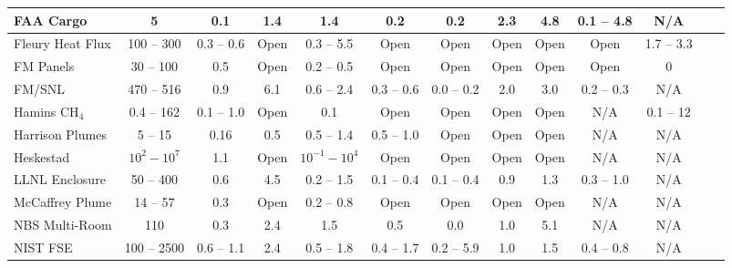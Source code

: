 \begin{table}
\begin{center}
\begin{tabular}{|l|c|c|c|c|c|c|c|c|c|c|c|c|}
FAA Cargo           & 5             & 0.1           & 1.4   & 1.4               & 0.2                 & 0.2           & 2.3         & 4.8         & 0.1 -- 4.8            & N/A                   \\ \hline
Fleury Heat Flux    & 100 -- 300    & 0.3 -- 0.6    & Open  & 0.3 -- 5.5        & Open                & Open          & Open        & Open        & Open                  & 1.7 -- 3.3            \\ \hline
FM Panels           & 30 -- 100     & 0.5           & Open  & 0.2 -- 0.5        & Open                & Open          & Open        & Open        & Open                  & 0                     \\ \hline
FM/SNL              & 470 -- 516    & 0.9           & 6.1   & 0.6 -- 2.4        & 0.3 -- 0.6          & 0.0 -- 0.2    & 2.0         & 3.0         & 0.2 -- 0.3            & N/A                   \\ \hline
Hamins CH$_4$       & 0.4 -- 162    & 0.1 -- 1.0    & Open  & 0.1               & Open                & Open          & Open        & Open        & N/A                   & 0.1 -- 12             \\ \hline
Harrison Plumes     & 5 -- 15       & 0.16          & 0.5   & 0.5 -- 1.4        & 0.5 -- 1.0          & Open          & Open        & Open        & N/A                   & N/A                   \\ \hline
Heskestad           & $10^2-10^7$   & 1.1           & Open  & $10^{-1}-10^4$    & Open                & Open          & Open        & Open        & N/A                   & N/A                   \\ \hline
LLNL Enclosure      & 50 -- 400     & 0.6           & 4.5   & 0.2 -- 1.5        & 0.1 -- 0.4          & 0.1 -- 0.4    & 0.9         & 1.3         & 0.3 -- 1.0            & N/A                   \\ \hline
McCaffrey Plume     & 14 -- 57      & 0.3           & Open  & 0.2 -- 0.8        & Open                & Open          & Open        & Open        & N/A                   & N/A                   \\ \hline
NBS Multi-Room      & 110           & 0.3           & 2.4   & 1.5               & 0.5                 & 0.0           & 1.0         & 5.1         & N/A                   & N/A                   \\ \hline
NIST FSE            & 100 -- 2500   & 0.6 -- 1.1    & 2.4   & 0.5 -- 1.8        & 0.4 -- 1.7          & 0.2 -- 5.9    & 1.0         & 1.5         & 0.4 -- 0.8            & N/A                   \\ \hline

\end{tabular}
\end{center}
\end{table}
